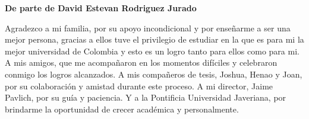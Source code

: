 \noindent\textbf{De parte de David Estevan Rodriguez Jurado}

Agradezco a mi familia, por su apoyo incondicional y por enseñarme a ser una mejor persona, gracias a ellos tuve el privilegio de estudiar en la que es para mi la mejor universidad de Colombia y esto es un logro tanto para ellos como para mi. A mis amigos, que me acompañaron en los momentos difíciles y celebraron conmigo los logros alcanzados. A mis compañeros de tesis, Joshua, Henao y Joan, por su colaboración y amistad durante este proceso. A mi director, Jaime Pavlich, por su guía y paciencia. Y a la Pontificia Universidad Javeriana, por brindarme la oportunidad de crecer académica y personalmente.


\vspace{0.5cm}

